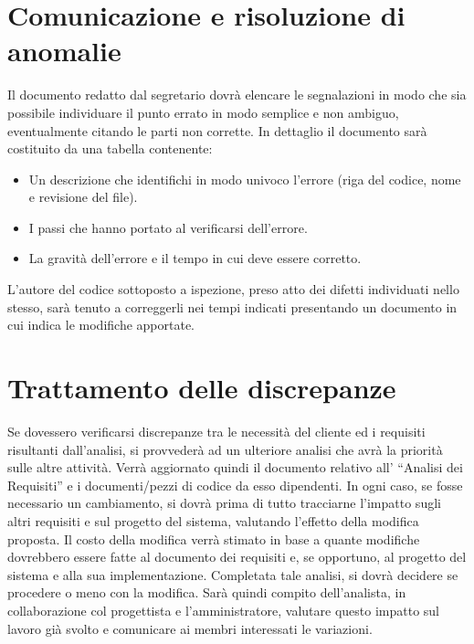 \documentclass[11pt,titlepage,a4paper]{report}
\begin{document}
\section{Comunicazione e risoluzione di anomalie}
Il documento redatto dal segretario dovr\`a elencare le segnalazioni in modo che sia possibile individuare il punto errato in modo semplice e non ambiguo, eventualmente citando le parti non corrette. In dettaglio il documento sar\`a costituito da una tabella contenente:
\begin{itemize}
\item Un descrizione che identifichi in modo univoco l'errore (riga del codice, nome e revisione del file).
\item I passi che hanno portato al verificarsi dell'errore.
\item La gravit\`a dell'errore e il tempo in cui deve essere corretto.
\end{itemize}
L'autore del codice sottoposto a ispezione, preso atto dei difetti individuati nello stesso, sar\`a tenuto a correggerli nei tempi indicati presentando un documento in cui indica le modifiche apportate.

\section{Trattamento delle discrepanze} 
Se dovessero verificarsi discrepanze tra le necessit\`a del cliente ed i requisiti risultanti dall'analisi, si provveder\`a ad un ulteriore analisi che avr\`a la priorit\`a sulle altre attivit\`a. Verr\`a aggiornato quindi il documento relativo all' ``Analisi dei Requisiti'' e  i documenti/pezzi di codice da esso dipendenti. In ogni caso, se fosse necessario un cambiamento, si dovr\`a prima di tutto tracciarne l'impatto sugli altri requisiti e sul progetto del sistema, valutando l'effetto della modifica proposta. Il costo della modifica verr\`a stimato in base a quante modifiche dovrebbero essere fatte al documento dei requisiti e, se opportuno, al progetto del sistema e alla sua implementazione. Completata tale analisi, si dovr\`a decidere se procedere o meno con la modifica. Sar\`a quindi compito dell'analista, in collaborazione col progettista e l'amministratore, valutare questo impatto sul lavoro gi\`a svolto e comunicare ai membri interessati le variazioni.
\end{document}

